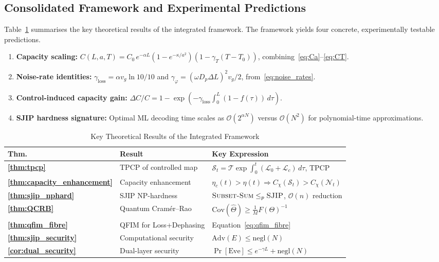 \documentclass[journal,twocolumn]{IEEEtran}
\theoremstyle{definition}
\theoremstyle{plain}
\begin{document}
\subsection{Consolidated Framework and Experimental Predictions}

Table~\ref{tab:theorems} summarises the key theoretical results of
the integrated framework.  The framework yields four concrete,
experimentally testable predictions.
\begin{enumerate}[leftmargin=*, label=(\arabic*), itemsep=2pt]
  \item \textbf{Capacity scaling:}
    $C(L,a,T) = C_0\,e^{-\alpha L}(1-e^{-\kappa/a^2})
    (1-\gamma_T(T-T_0))$, combining~\eqref{eq:Ca}--\eqref{eq:CT}.
  \item \textbf{Noise-rate identities:}
    $\gamma_{\mathrm{loss}} = \alpha v_g \ln 10 / 10$ and
    $\gamma_\varphi = (\omega D_p \Delta L)^2 v_g / 2$,
    from~\eqref{eq:noise_rates}.
  \item \textbf{Control-induced capacity gain:}
    $\Delta C/C = 1 - \exp(-\gamma_{\mathrm{loss}}
    \int_0^L(1-f(\tau))\,d\tau)$.
  \item \textbf{SJIP hardness signature:} Optimal ML decoding time
    scales as $\mathcal{O}(2^{\alpha N})$ versus
    $\mathcal{O}(N^2)$ for polynomial-time approximations.
\end{enumerate}

\begin{table}[t]
\centering
\caption{Key Theoretical Results of the Integrated Framework}
\label{tab:theorems}
\renewcommand{\arraystretch}{1.45}
\begin{tabular}{>{\bfseries\small}p{1.2cm} >{\small}p{2.2cm}
                >{\small}p{4.1cm}}
\toprule
\textbf{Thm.} & \textbf{Result} & \textbf{Key Expression} \\
\midrule
\ref{thm:tpcp}
  & TPCP of controlled map
  & $\mathcal{S}_t = \mathcal{T}\exp\int_0^t
    (\mathcal{L}_0 + \mathcal{L}_c)\,d\tau$, TPCP \\[3pt]
\ref{thm:capacity_enhancement}
  & Capacity enhancement
  & $\eta_c(t) > \eta(t)
    \Rightarrow C_\chi(\mathcal{S}_t) > C_\chi(\mathcal{N}_t)$ \\[3pt]
\ref{thm:sjip_nphard}
  & SJIP NP-hardness
  & $\textsc{Subset-Sum} \le_p \textsc{SJIP}$,
    $\mathcal{O}(n)$ reduction \\[3pt]
\ref{thm:QCRB}
  & Quantum Cram\'{e}r--Rao
  & $\mathrm{Cov}(\hat\Theta) \ge \frac{1}{M}F(\Theta)^{-1}$ \\[3pt]
\ref{thm:qfim_fibre}
  & QFIM for Loss+Dephasing
  & Equation~\eqref{eq:qfim_fibre} \\[3pt]
\ref{thm:sjip_security}
  & Computational security
  & $\mathrm{Adv}(E) \le \mathrm{negl}(N)$ \\[3pt]
\ref{cor:dual_security}
  & Dual-layer security
  & $\Pr[\text{Eve}] \le e^{-\gamma L}
    + \mathrm{negl}(N)$ \\
\bottomrule
\end{tabular}
\end{table}
\end{document}
